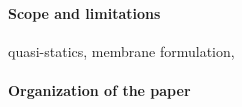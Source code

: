
\paragraph{Scope and limitations}
quasi-statics, membrane formulation,

\paragraph{Organization of the paper}


